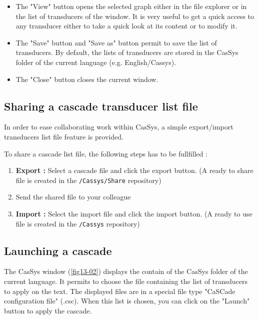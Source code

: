 \begin{itemize}
\begin{itemize}
			\item The "View" button opens the selected graph either in the file explorer or in the list of transducers of the window. It is very useful to get a quick access to any transducer either to take a quick look at its content or to modify it.
			\item The "Save" button and "Save as" button permit to save the list of transducers. By default, the lists of transducers are stored in the CasSys folder of the current language (e.g. English/Cassys).
			\item The "Close" button closes the current window.
		\end{itemize}
\end{itemize}

\subsection{Sharing a cascade transducer list file}
\label{subsec:shareCascade}

In order to ease collaborating work within CasSys, a  simple export/import
transducers list file feature is provided.

To share a cascade list file, the following steps has to be fullfilled :
\begin{enumerate}
  \item \textbf{Export :} Select a cascade file and click the export button. (A
  ready to share file is created in the \texttt{/Cassys/Share} repository)
  \item Send the shared file to your colleague
  \item \textbf{Import :} Select the import file and click the import button.
  (A ready to use file is created in the \texttt{/Cassys} repository)
\end{enumerate}

\subsection{Launching a cascade}
\label{subsec:launchCascade}

The CasSys window (\ref{fig13-02}) displays the contain of the CasSys folder of the current language. It permits to choose 
the file containing the list of transducers to apply on the text. The displayed files are in a special file type "CaSCade configuration file" (.csc). 
When this list is chosen, you can click on the "Launch" button to apply the cascade.

